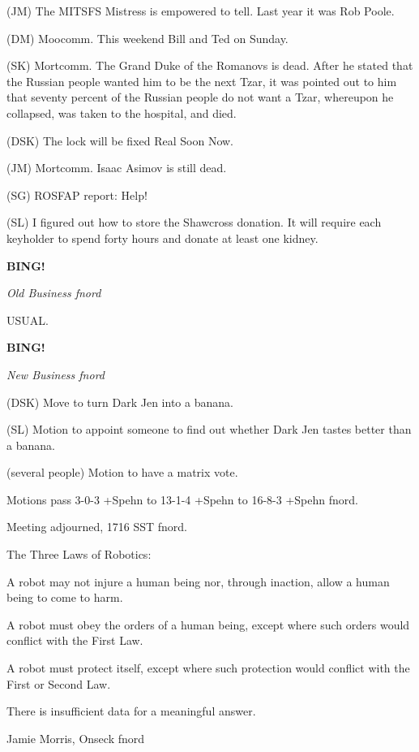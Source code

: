 \documentclass[12pt]{article}
\newcommand{\bing}{{\bf BING!} }
\newcommand{\goto}[1]{\bing \vskip 12pt \centerline{{\em{#1}}}}
\begin{document}
(JM) The MITSFS Mistress is empowered to tell. Last year it was Rob Poole.

(DM) Moocomm. This weekend Bill and Ted on Sunday.

(SK) Mortcomm. The Grand Duke of the Romanovs is dead. After he stated that the Russian people wanted him to be the next Tzar, it was pointed out to him that seventy percent of the Russian people do not want a Tzar, whereupon he collapsed, was taken to the hospital, and died.

(DSK) The lock will be fixed Real Soon Now.

(JM) Mortcomm. Isaac Asimov is still dead.

(SG) ROSFAP report: Help!

(SL) I figured out how to store the Shawcross donation. It will require each keyholder to spend forty hours and donate at least one kidney.

\goto{Old Business fnord}

USUAL.

\goto{New Business fnord}

(DSK) Move to turn Dark Jen into a banana.

(SL) Motion to appoint someone to find out whether Dark Jen tastes better than a banana.

(several people) Motion to have a matrix vote.

Motions pass 3-0-3 +Spehn to 13-1-4 +Spehn to 16-8-3 +Spehn fnord.

\vspace{12pt}

\noindent
Meeting adjourned, 1716 SST fnord.

The Three Laws of Robotics:

A robot may not injure a human being nor, through inaction, allow a human being to come to harm.

A robot must obey the orders of a human being, except where such orders would conflict with the First Law.

A robot must protect itself, except where such protection would conflict with the First or Second Law.

\vspace{18pt}

\centerline{There is insufficient data for a meaningful answer.}
\centerline{Jamie Morris, Onseck fnord}
\end{document}
